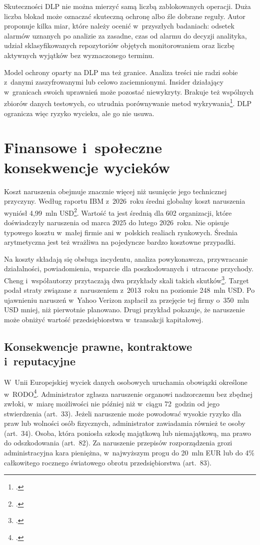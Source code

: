 \documentclass[12pt,a4paper]{article}
\begin{document}
Skuteczności DLP nie można mierzyć samą liczbą zablokowanych operacji. Duża
liczba blokad może oznaczać skuteczną ochronę albo źle dobrane reguły. Autor
proponuje kilka miar, które należy ocenić w~przyszłych badaniach: odsetek
alarmów uznanych po analizie za zasadne, czas od alarmu do decyzji
analityka, udział sklasyfikowanych repozytoriów objętych monitorowaniem oraz
liczbę aktywnych wyjątków bez wyznaczonego terminu.

Model ochrony oparty na DLP ma też granice. Analiza treści nie radzi sobie
z~danymi zaszyfrowanymi lub celowo zaciemnionymi. Insider działający
w~granicach swoich uprawnień może pozostać niewykryty. Brakuje też wspólnych
zbiorów danych testowych, co utrudnia porównywanie metod
wykrywania\footcite{cheng2017enterprise}. DLP ogranicza więc ryzyko wycieku,
ale go nie usuwa.

\section{Finansowe i~społeczne konsekwencje wycieków}

Koszt naruszenia obejmuje znacznie więcej niż usunięcie jego technicznej
przyczyny. Według raportu IBM z~2026~roku średni globalny koszt naruszenia
wyniósł 4,99~mln USD\footcite{ibm2026cost}. Wartość ta jest średnią dla 602
organizacji, które doświadczyły naruszenia od marca 2025 do lutego
2026~roku. Nie opisuje typowego kosztu w~małej firmie ani w~polskich realiach
rynkowych. Średnia arytmetyczna jest też wrażliwa na pojedyncze bardzo
kosztowne przypadki.

Na koszty składają się obsługa incydentu, analiza powykonawcza, przywracanie
działalności, powiadomienia, wsparcie dla poszkodowanych i~utracone
przychody. Cheng i~współautorzy przytaczają dwa przykłady skali takich
skutków\footcite{cheng2017enterprise}. Target podał straty związane
z~naruszeniem z~2013~roku na poziomie 248~mln USD. Po ujawnieniu naruszeń
w~Yahoo Verizon zapłacił za przejęcie tej firmy o~350~mln USD mniej, niż
pierwotnie planowano. Drugi przykład pokazuje, że naruszenie może obniżyć
wartość przedsiębiorstwa w~transakcji kapitałowej.

\subsection{Konsekwencje prawne, kontraktowe i~reputacyjne}

W~Unii Europejskiej wyciek danych osobowych uruchamia obowiązki określone
w~RODO\footcite{rodo2016}. Administrator zgłasza naruszenie organowi
nadzorczemu bez zbędnej zwłoki, w~miarę możliwości nie później niż w~ciągu
72~godzin od jego stwierdzenia (art.~33). Jeżeli naruszenie może powodować
wysokie ryzyko dla praw lub wolności osób fizycznych, administrator
zawiadamia również te osoby (art.~34). Osoba, która poniosła szkodę
majątkową lub niemajątkową, ma prawo do odszkodowania (art.~82). Za
naruszenie przepisów rozporządzenia grozi administracyjna kara pieniężna,
w~najwyższym progu do 20~mln EUR lub do 4\% całkowitego rocznego światowego
obrotu przedsiębiorstwa (art.~83).
\end{document}
